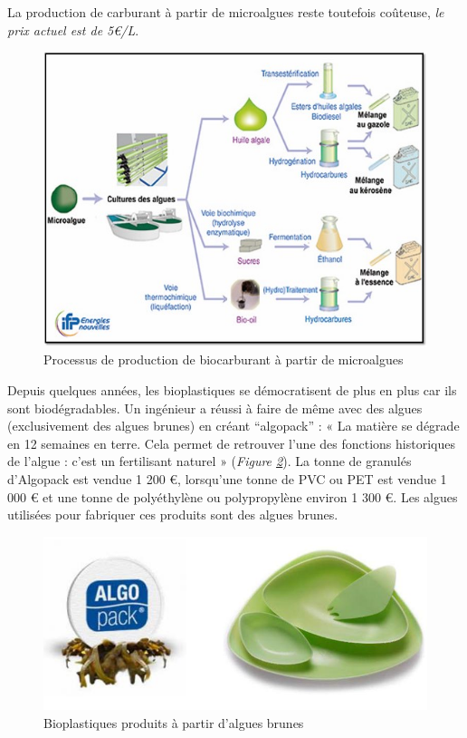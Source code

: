 \documentclass[
]{book}
\begin{document}
La production de carburant à partir de microalgues reste toutefois coûteuse, \emph{le prix actuel est de 5€/L}.

\begin{figure}

{\centering \includegraphics{images/biocarburant} 

}

\caption{Processus de production de biocarburant à partir de microalgues}\label{fig:biocarburant}
\end{figure}

Depuis quelques années, les bioplastiques se démocratisent de plus en plus car ils sont biodégradables. Un ingénieur a réussi à faire de même avec des algues (exclusivement des algues brunes) en créant ``algopack'' : « La matière se dégrade en 12 semaines en terre. Cela permet de retrouver l'une des fonctions historiques de l'algue : c'est un fertilisant naturel » (\emph{Figure \ref{fig:algopack}}).
La tonne de granulés d'Algopack est vendue 1 200 €, lorsqu'une tonne de PVC ou PET est vendue 1 000 € et une tonne de polyéthylène ou polypropylène environ 1 300 €. Les algues utilisées pour fabriquer ces produits sont des algues brunes.

\begin{figure}

{\centering \includegraphics{images/algopack} 

}

\caption{Bioplastiques produits à partir d'algues brunes}\label{fig:algopack}
\end{figure}
\end{document}
